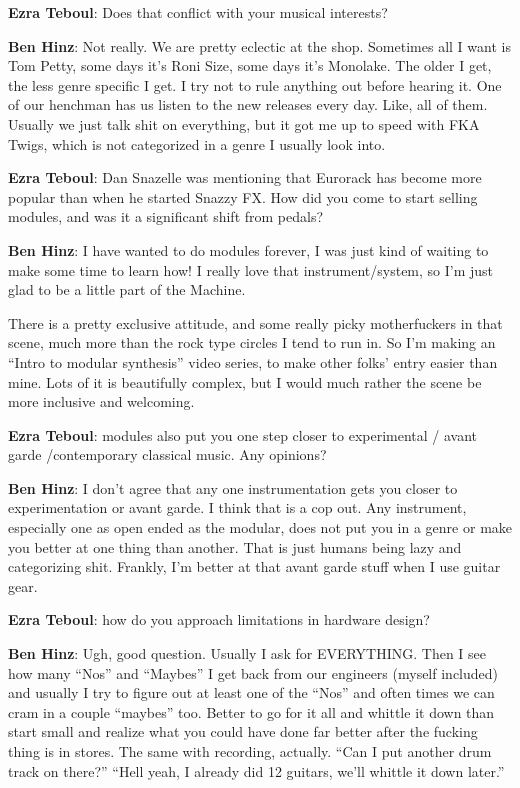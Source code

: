 \textbf{Ezra Teboul}: Does that conflict with your musical interests? 

\textbf{Ben Hinz}: Not really. We are pretty eclectic at the shop. Sometimes all I want is Tom Petty, some days it’s Roni Size, some days it's Monolake. The older I get, the less genre specific I get. I try not to rule anything out before hearing it. One of our henchman has us listen to the new releases every day. Like, all of them. Usually we just talk shit on everything, but it got me up to speed with FKA Twigs, which is not categorized in a genre I usually look into. 

\textbf{Ezra Teboul}: Dan Snazelle was mentioning that Eurorack has become more popular than when he started Snazzy FX. How did you come to start selling modules, and was it a significant shift from pedals? 

\textbf{Ben Hinz}: I have wanted to do modules forever, I was just kind of waiting to make some time to learn how! I really love that instrument/system, so I'm just glad to be a little part of the Machine. 

There is a pretty exclusive attitude, and some really picky motherfuckers in that scene, much more than the rock type circles I tend to run in. So I'm making an ``Intro to modular synthesis'' video series, to make other folks' entry easier than mine.  Lots of it is beautifully complex, but I would much rather the scene be more inclusive and welcoming.

\textbf{Ezra Teboul}: modules also put you one step closer to experimental / avant garde /contemporary classical music. Any opinions? 

\textbf{Ben Hinz}: I don’t agree that any one instrumentation gets you closer to experimentation or avant garde.  I think that is a cop out.  Any instrument, especially one as open ended as the modular, does not put you in a genre or make you better at one thing than another. That is just humans being lazy and categorizing shit. Frankly, I'm better at that avant garde stuff when I use guitar gear.

\textbf{Ezra Teboul}: how do you approach limitations in hardware design? 

\textbf{Ben Hinz}: Ugh, good question. Usually I ask for EVERYTHING. Then I see how many ``Nos'' and ``Maybes'' I get back from our engineers (myself included) and usually I try to figure out at least one of the ``Nos'' and often times we can cram in a couple ``maybes'' too. Better to go for it all and whittle it down than start small and realize 
what you could have done far better after the fucking thing is in stores. The same with recording, actually. ``Can I put another drum track on there?'' ``Hell yeah, I already did 12 guitars, we'll whittle it down later.''

